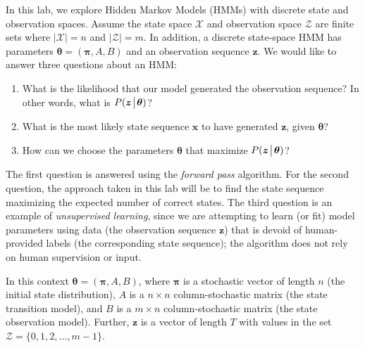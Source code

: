 
\label{lab:hmm}

In this lab, we explore Hidden Markov Models (HMMs) with discrete state and observation spaces. 
Assume the state space $\mathscr{X}$ and observation space $\mathscr{Z}$ are finite sets where $\vert \mathscr{X}\vert = n$ and $\vert \mathscr{Z} \vert = m$. 
In addition, a discrete state-space HMM has parameters $\boldsymbol\theta = (\boldsymbol\pi, A, B)$ and an observation sequence $\boldsymbol z$. 
We would like to answer three questions about an HMM:
\begin{enumerate}
 \item What is the likelihood that our model generated the observation sequence? In other words, what is $P(\boldsymbol z \!\mathrel{\big|}\! \boldsymbol\theta)$?
 \item What is the most likely state sequence $\boldsymbol x$ to have generated $\boldsymbol z$, given $\boldsymbol\theta$?
 \item How can we choose the parameters $\boldsymbol\theta$ that maximize $P(\boldsymbol z \!\mathrel{\big|}\! \boldsymbol\theta)$?
\end{enumerate}
The first question is answered using the \emph{forward pass} algorithm. 
For the second question, the approach taken in this lab will be to find the state sequence maximizing the expected number of correct states.
The third question is an example of \emph{unsupervised learning}, since we are attempting to learn (or fit) model parameters using data (the observation sequence $\boldsymbol z$) that is devoid
of human-provided labels (the corresponding state sequence); the algorithm does not rely on human supervision or input.

In this context $\boldsymbol\theta = \left( \boldsymbol\pi, A, B\right)$, where $\boldsymbol\pi$ is a stochastic vector of length $n$ (the initial state distribution), $A$ is a $n \times n$  
column-stochastic matrix (the state transition model), and $B$ is a $m \times n$ column-stochastic matrix (the state observation model).
Further, $\boldsymbol z$ is a vector of length $T$ with values in the set $\mathscr{Z} = \{0,1,2,\ldots,m-1\}$.

